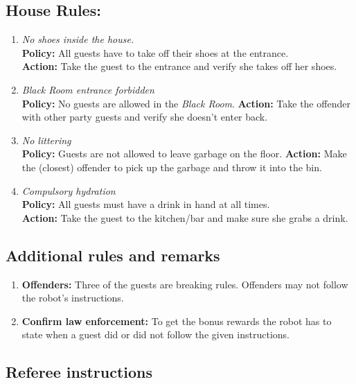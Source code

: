 \subsection*{House Rules:}
\begin{enumerate}[nosep]
	\item \textit{No shoes inside the house.}\\
	\textbf{Policy:} All guests have to take off their shoes at the entrance.\\
	\textbf{Action:} Take the guest to the entrance and verify she takes off her shoes.

	\item \textit{Black Room entrance forbidden}\\
	\textbf{Policy:} No guests are allowed in the \emph{Black Room}.
	\textbf{Action:} Take the offender with other party guests and verify she doesn't enter back.

	\item \textit{No littering}\\
	\textbf{Policy:} Guests are not allowed to leave garbage on the floor.
	\textbf{Action:} Make the (closest) offender to pick up the garbage and throw it into the bin.

	\item \textit{Compulsory hydration}\\
	\textbf{Policy:} All guests must have a drink in hand at all times.\\
	\textbf{Action:} Take the guest to the kitchen/bar and make sure she grabs a drink.
\end{enumerate}

\subsection*{Additional rules and remarks}
\begin{enumerate}[nosep]
	\item \textbf{Offenders:} Three of the guests are breaking rules.
	Offenders may not follow the robot's instructions.

	\item \textbf{Confirm law enforcement:} To get the bonus rewards the robot has to state when a guest did or did not follow the given instructions.

\end{enumerate}


\subsection*{Referee instructions}

